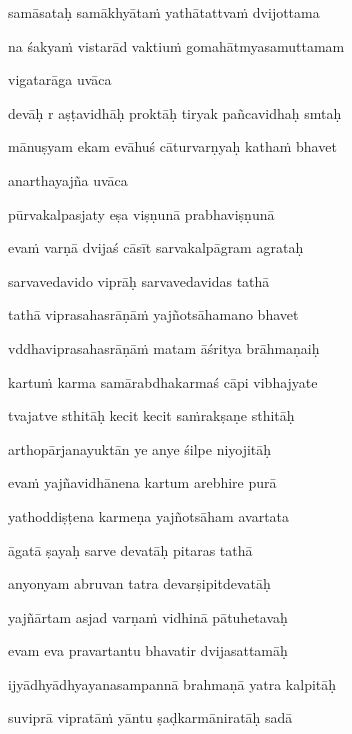 samāsataḥ samākhyāta\.m yathātattva\.m dvijottama\thinspace{\dandab} \dontdisplaylinenum

na śakya\.m vistarād vaktiu\.m gomahātmyasamuttamam \veg\dontdisplaylinenum

vigatarāga uvāca~{\dandab}\dontdisplaylinenum 

devāḥ r aṣṭavidhāḥ proktāḥ tiryak pañcavidhaḥ smtaḥ\thinspace{\danda} \dontdisplaylinenum

mānuṣyam ekam evāhuś cāturvarṇyaḥ katha\.m bhavet \veg\dontdisplaylinenum

anarthayajña uvāca~{\dandab}\dontdisplaylinenum 

pūrvakalpasjaty eṣa viṣṇunā prabhaviṣṇunā\thinspace{\danda} \dontdisplaylinenum

eva\.m varṇā dvijaś cāsīt sarvakalpāgram agrataḥ \veg\dontdisplaylinenum

sarvavedavido viprāḥ sarvavedavidas tathā\thinspace{\dandab} \dontdisplaylinenum

tathā viprasahasrāṇā\.m yajñotsāhamano bhavet \veg\dontdisplaylinenum

vddhaviprasahasrāṇā\.m matam āśritya brāhmaṇaiḥ\thinspace{\dandab} \dontdisplaylinenum

kartu\.m karma samārabdhakarmaś cāpi vibhajyate \veg\dontdisplaylinenum

tvajatve sthitāḥ kecit kecit sa\.mrakṣaṇe sthitāḥ\thinspace{\dandab} \dontdisplaylinenum

arthopārjanayuktān ye anye śilpe niyojitāḥ \veg\dontdisplaylinenum

eva\.m yajñavidhānena kartum arebhire purā\thinspace{\dandab} \dontdisplaylinenum

yathoddiṣṭena karmeṇa yajñotsāham avartata \veg\dontdisplaylinenum

āgatā ṣayaḥ sarve devatāḥ pitaras tathā\thinspace{\dandab} \dontdisplaylinenum

anyonyam abruvan tatra devarṣipitdevatāḥ \veg\dontdisplaylinenum

yajñārtam asjad varṇa\.m vidhinā pātuhetavaḥ\thinspace{\dandab} \dontdisplaylinenum

evam eva pravartantu bhavatir dvijasattamāḥ \veg\dontdisplaylinenum

ijyādhyādhyayanasampannā brahmaṇā yatra kalpitāḥ\thinspace{\dandab} \dontdisplaylinenum

suviprā vipratā\.m yāntu ṣaḍkarmāniratāḥ sadā \veg\dontdisplaylinenum

